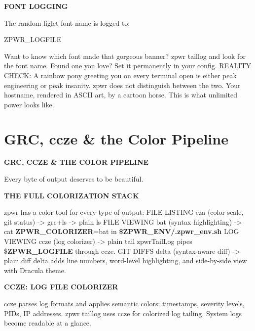 \documentclass[11pt,a4paper,twoside]{book}
\begin{document}
\vspace{12pt}
{\bfseries\color{neonyellow} FONT LOGGING}\vspace{4pt}

The random figlet font name is logged to:

\begin{codebox}
\color{neongreen}ZPWR\_LOGFILE\\
\end{codebox}

Want to know which font made that gorgeous banner? zpwr taillog  and look for the font name. Found one you love? Set it permanently in your config. REALITY CHECK: A rainbow pony greeting you on every terminal open is either peak engineering or peak insanity. zpwr does not distinguish between the two. Your hostname, rendered in ASCII art, by a cartoon horse. This is what unlimited power looks like.


\vspace{16pt}

\section{GRC, ccze \& the Color Pipeline}


\vspace{10pt}
{\large\bfseries\color{neoncyan} GRC, CCZE \& THE COLOR PIPELINE}\vspace{6pt}

Every byte of output deserves to be beautiful.


\vspace{12pt}
{\bfseries\color{neonyellow} THE FULL COLORIZATION STACK}\vspace{4pt}

zpwr has a color tool for every type of output: FILE LISTING eza (color-scale, git status) -> grc+ls -> plain ls FILE VIEWING bat (syntax highlighting) -> cat \textbf{ZPWR\_COLORIZER}=bat in \textbf{\$ZPWR\_ENV/.zpwr\_env.sh} LOG VIEWING ccze (log colorizer) -> plain tail zpwrTailLog pipes \$\textbf{ZPWR\_LOGFILE} through ccze. GIT DIFFS delta (syntax-aware diff) -> plain diff delta adds line numbers, word-level highlighting, and side-by-side view with Dracula theme.


\vspace{12pt}
{\bfseries\color{neonyellow} CCZE: LOG FILE COLORIZER}\vspace{4pt}

ccze parses log formats and applies semantic colors: timestamps, severity levels, PIDs, IP addresses. zpwr taillog  uses ccze for colorized log tailing. System logs become readable at a glance.
\end{document}
